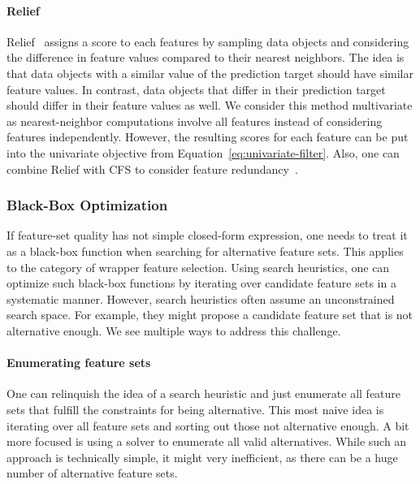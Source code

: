 \documentclass{article}
\theoremstyle{definition}
\begin{document}
\paragraph{Relief}

Relief~\cite{kira1992feature} assigns a score to each features by sampling data objects and considering the difference in feature values compared to their nearest neighbors.
The idea is that data objects with a similar value of the prediction target should have similar feature values.
In contrast, data objects that differ in their prediction target should differ in their feature values as well.
We consider this method multivariate as nearest-neighbor computations involve all features instead of considering features independently.
However, the resulting scores for each feature can be put into the univariate objective from Equation~\ref{eq:univariate-filter}.
Also, one can combine Relief with CFS to consider feature redundancy~\cite{hall1999correlation}.

\subsubsection{Black-Box Optimization}
\label{sec:approach:objectives:black-box}

If feature-set quality has not simple closed-form expression, one needs to treat it as a black-box function when searching for alternative feature sets.
This applies to the category of wrapper feature selection.
Using search heuristics, one can optimize such black-box functions by iterating over candidate feature sets in a systematic manner.
However, search heuristics often assume an unconstrained search space.
For example, they might propose a candidate feature set that is not alternative enough.
We see multiple ways to address this challenge.

\paragraph{Enumerating feature sets}

One can relinquish the idea of a search heuristic and just enumerate all feature sets that fulfill the constraints for being alternative.
This most naive idea is iterating over all feature sets and sorting out those not alternative enough.
A bit more focused is using a solver to enumerate all valid alternatives.
While such an approach is technically simple, it might very inefficient, as there can be a huge number of alternative feature sets.
\end{document}
